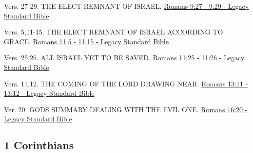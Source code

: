 \documentclass[
  ignorenonframetext,
]{beamer}
\begin{document}
\begin{frame}{9}
\label{section-193}
\begin{block}{Vers. 27-29. THE ELECT REMNANT OF ISRAEL.}
\label{vers.-27-29.-the-elect-remnant-of-israel.}
\href{https://read.lsbible.org/?q=rom9\%3A27-29}{Romans 9:27 - 9:29 -
Legacy Standard Bible}
\end{block}
\end{frame}

\begin{frame}{11}
\label{section-194}
\begin{block}{Vers. 5,11-15. THE ELECT REMNANT OF ISRAEL ACCORDING TO
GRACE.}
\label{vers.-511-15.-the-elect-remnant-of-israel-according-to-grace.}
\href{https://read.lsbible.org/?q=rom11\%3A5-15}{Romans 11:5 - 11:15 -
Legacy Standard Bible}
\end{block}

\begin{block}{Vers. 25,26. ALL ISRAEL YET TO BE SAVED.}
\label{vers.-2526.-all-israel-yet-to-be-saved.}
\href{https://read.lsbible.org/?q=rom11\%3A25-26}{Romans 11:25 - 11:26 -
Legacy Standard Bible}
\end{block}
\end{frame}

\begin{frame}{13}
\label{section-195}
\begin{block}{Vers. 11,12. THE COMING OF THE LORD DRAWING NEAR.}
\label{vers.-1112.-the-coming-of-the-lord-drawing-near.}
\href{https://read.lsbible.org/?q=rom13\%3A11-12}{Romans 13:11 - 13:12 -
Legacy Standard Bible}
\end{block}
\end{frame}

\begin{frame}{16}
\label{section-196}
\begin{block}{Ver. 20. GOD\textquotesingle S SUMMARY DEALING WITH THE
EVIL ONE.}
\label{ver.-20.-gods-summary-dealing-with-the-evil-one.}
\href{https://read.lsbible.org/?q=rom16\%3A20}{Romans 16:20 - Legacy
Standard Bible}
\end{block}
\end{frame}

\subsection{1 Corinthians}\label{corinthians}
\end{document}

